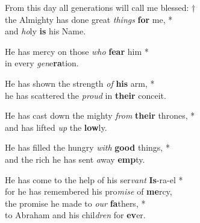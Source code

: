 
From this day all generations will call me blessed: †\\
the Almighty has done great \emph{things} \textbf{for} me, *\\
and \emph{ho}ly \textbf{is} his Name.

He has mercy on those \emph{who} \textbf{fear} him *\\
in every \emph{gen}e\textbf{ra}tion.

He has shown the strength \emph{of} \textbf{his} arm, *\\
he has scattered the \emph{proud} in \textbf{their} conceit.

He has cast down the mighty \emph{from} \textbf{their} thrones, *\\
and has lifted \emph{up} the \textbf{low}ly.

He has filled the hungry \emph{with} \textbf{good} things, *\\
and the rich he has sent \emph{a}way \textbf{emp}ty.

He has come to the help of his ser\emph{vant} \textbf{Is}-ra-el *\\
for he has remembered his pro\emph{mise} of \textbf{me}rcy,\\
the promise he made to \emph{our} \textbf{fa}thers, *\\
to Abraham and his chil\emph{dren} for \textbf{ev}er.